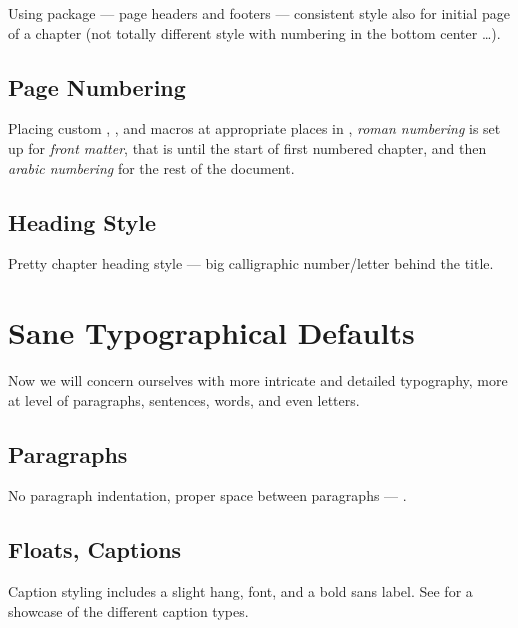 Using  package --- page headers and footers --- consistent style also for initial page of a chapter (not totally different style with numbering in the bottom center \ldots).

\subsection{Page Numbering}%
\label{sub:Page Numbering}

Placing custom \custommacro{\frontmatter}, \custommacro{\mainmatter}, and \custommacro{\backmatter} macros at appropriate places in , \emph{roman numbering} is set up for \emph{front matter}, that is until the start of first numbered chapter, and then \emph{arabic numbering} for the rest of the document.


\subsection{Heading Style}%
\label{sub:Heading Style}

Pretty chapter heading style --- big calligraphic number/letter behind the title.


\section{Sane Typographical Defaults}%
\label{sec:Sane Typographical Defaults}

Now we will concern ourselves with more intricate and detailed typography, more at level of paragraphs, sentences, words, and even letters.

\subsection{Paragraphs}%
\label{sub:Paragraphs}

No paragraph indentation, proper space between paragraphs --- .

\subsection{Floats, Captions}%
\label{sub:Floats_Captions}

Caption styling includes a slight hang, \macro{\footnotesize} font, and a bold sans label.
See  for a showcase of the different caption types.


